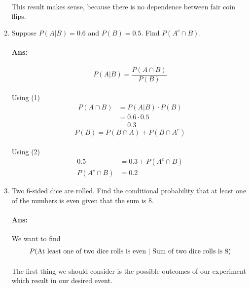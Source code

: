 \documentclass{article}
\begin{document}
\begin{enumerate}
    \paragraph{}This result makes sense, because there is no dependence between fair coin flips.
    
    \item Suppose $P(A|B) = 0.6$ and $P(B) = 0.5$. Find $P(A^c \cap B)$.
    \paragraph{Ans:}
    \begin{equation}
        P(A|B) = \frac{P(A\cap B)}{P(B)}
    \end{equation}
    \paragraph{}Using (1)
    \begin{align*}
        P(A\cap B) &= P(A|B) \cdot P(B)\\
                   &= 0.6 \cdot 0.5 \\
                   &= 0.3
    \end{align*}
    \begin{equation}
        P(B) = P(B \cap A) + P(B \cap A^c)
    \end{equation}
    \paragraph{}Using (2)
    \begin{align*}
        0.5 &= 0.3 + P(A^c \cap B)\\
        P(A^c \cap B) &= 0.2
    \end{align*}
    \item Two 6-sided dice are rolled. Find the conditional probability that at least one of the
numbers is even given that the sum is 8.

    \paragraph{Ans:} We want to find
    \begin{align*}
        P(\text{At least one of two dice rolls is even \textbar{}  Sum of two dice rolls is 8})
    \end{align*}
    \paragraph{}The first thing we should consider is the possible outcomes of our experiment which result
    in our desired event.
    

\end{enumerate}
\end{document}
